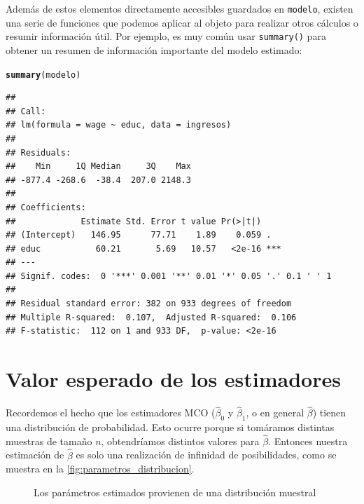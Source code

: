 \documentclass{report}\usepackage[]{graphicx}\usepackage[]{color}
\makeatletter
\newcommand{\hlstd}[1]{\textcolor[rgb]{0.345,0.345,0.345}{#1}}%
\newcommand{\hlkwd}[1]{\textcolor[rgb]{0.737,0.353,0.396}{\textbf{#1}}}%
\newenvironment{kframe}{%
 \def\at@end@of@kframe{}%
 \ifinner\ifhmode%
  \def\at@end@of@kframe{\end{minipage}}%
  \begin{minipage}{\columnwidth}%
 \fi\fi%
 \def\FrameCommand##1{\hskip\@totalleftmargin \hskip-\fboxsep
 \colorbox{shadecolor}{##1}\hskip-\fboxsep
     \hskip-\linewidth \hskip-\@totalleftmargin \hskip\columnwidth}%
 \MakeFramed {\advance\hsize-\width
   \@totalleftmargin\z@ \linewidth\hsize
   \@setminipage}}%
 {\par\unskip\endMakeFramed%
 \at@end@of@kframe}
\newenvironment{knitrout}{}{} %
\makeatother
\begin{document}
Además de estos elementos directamente accesibles guardados en \verb|modelo|, existen una serie de funciones que podemos aplicar al objeto para realizar otros cálculos o resumir información útil. Por ejemplo, es muy común usar \verb|summary()| para obtener un resumen de información importante del modelo estimado:
\begin{knitrout}
\color{fgcolor}\begin{kframe}
\begin{alltt}
\hlkwd{summary}\hlstd{(modelo)}
\end{alltt}
\begin{verbatim}
## 
## Call:
## lm(formula = wage ~ educ, data = ingresos)
## 
## Residuals:
##    Min     1Q Median     3Q    Max 
## -877.4 -268.6  -38.4  207.0 2148.3 
## 
## Coefficients:
##             Estimate Std. Error t value Pr(>|t|)    
## (Intercept)   146.95      77.71    1.89    0.059 .  
## educ           60.21       5.69   10.57   <2e-16 ***
## ---
## Signif. codes:  0 '***' 0.001 '**' 0.01 '*' 0.05 '.' 0.1 ' ' 1
## 
## Residual standard error: 382 on 933 degrees of freedom
## Multiple R-squared:  0.107,	Adjusted R-squared:  0.106 
## F-statistic:  112 on 1 and 933 DF,  p-value: <2e-16
\end{verbatim}
\end{kframe}
\end{knitrout}

\section{Valor esperado de los estimadores}

Recordemos el hecho que los estimadores MCO ($\hat\beta_0$ y $\hat\beta_1$, o en general $\hat\beta$) tienen una distribución de probabilidad.
Esto ocurre porque si tomáramos distintas muestras de tamaño $n$, obtendríamos distintos valores para $\hat\beta$.
Entonces nuestra estimación de $\hat\beta$ es solo una realización de infinidad de posibilidades, como se muestra en la \autoref{fig:parametros_distribucion}.

\begin{figure}[htb]
  \centering
  \caption{Los parámetros estimados provienen de una distribución muestral}
  \label{fig:parametros_distribucion}
\end{figure}%
\end{document}

